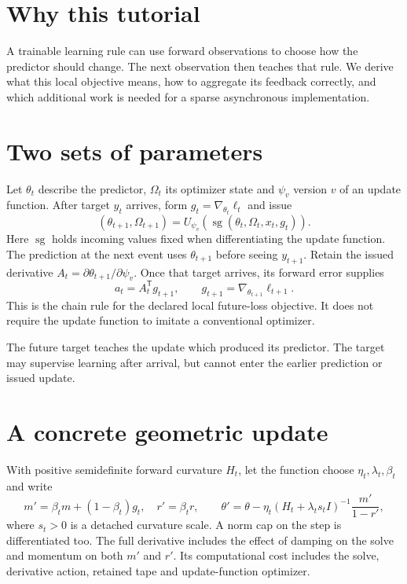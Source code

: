 \documentclass[11pt]{article}
\begin{document}
\section*{Why this tutorial}
A trainable learning rule can use forward observations to choose how the predictor should change. The next observation then teaches that rule. We derive what this local objective means, how to aggregate its feedback correctly, and which additional work is needed for a sparse asynchronous implementation.
\section{Two sets of parameters}
Let $\theta_t$ describe the predictor, $\Omega_t$ its optimizer state and $\psi_v$ version $v$ of an update function. After target $y_t$ arrives, form $g_t=\nabla_{\theta_t}\ell_t$ and issue
\[
 (\theta_{t+1},\Omega_{t+1})=U_{\psi_v}
 (\operatorname{sg}(\theta_t,\Omega_t,x_t,g_t)).
\]
Here $\operatorname{sg}$ holds incoming values fixed when differentiating the update function. The prediction at the next event uses $\theta_{t+1}$ before seeing $y_{t+1}$. Retain the issued derivative $A_t=\partial\theta_{t+1}/\partial\psi_v$. Once that target arrives, its forward error supplies
\[
 a_t=A_t^{\mathsf T}g_{t+1},\qquad
 g_{t+1}=\nabla_{\theta_{t+1}}\ell_{t+1}.
\]
This is the chain rule for the declared local future-loss objective. It does not require the update function to imitate a conventional optimizer.
\begin{keyidea}
The future target teaches the update which produced its predictor. The target may supervise learning after arrival, but cannot enter the earlier prediction or issued update.
\end{keyidea}
\section{A concrete geometric update}
With positive semidefinite forward curvature $H_t$, let the function choose $\eta_t,\lambda_t,\beta_t$ and write
\[
 m'=\beta_tm+(1-\beta_t)g_t,\quad r'=\beta_tr,\qquad
 \theta'=\theta-\eta_t(H_t+\lambda_t s_t I)^{-1}\frac{m'}{1-r'},
\]
where $s_t>0$ is a detached curvature scale. A norm cap on the step is differentiated too. The full derivative includes the effect of damping on the solve and momentum on both $m'$ and $r'$. Its computational cost includes the solve, derivative action, retained tape and update-function optimizer.
\newpage
\end{document}
